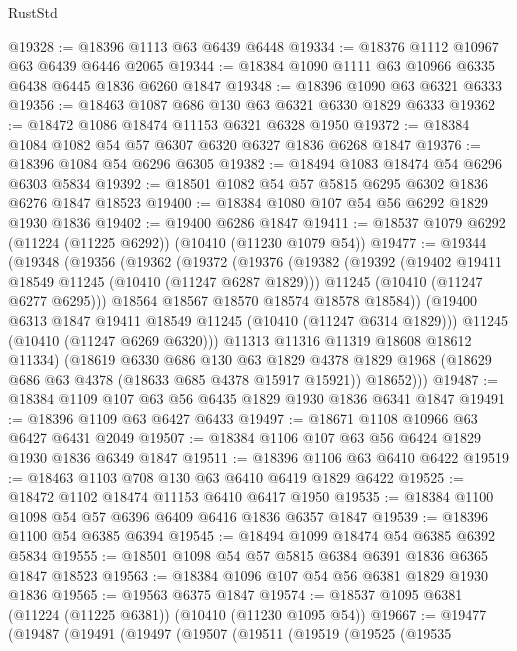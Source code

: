 \begin{lexlean}{RustStd}
\begin{coremodule}
@19328 := @18396 @1113 @63 @6439 @6448
@19334 := @18376 @1112 @10967 @63 @6439 @6446 @2065
@19344 := @18384 @1090 @1111 @63 @10966 @6335 @6438 @6445 @1836 @6260 @1847
@19348 := @18396 @1090 @63 @6321 @6333
@19356 := @18463 @1087 @686 @130 @63 @6321 @6330 @1829 @6333
@19362 := @18472 @1086 @18474 @11153 @6321 @6328 @1950
@19372 := @18384 @1084 @1082 @54 @57 @6307 @6320 @6327 @1836 @6268 @1847
@19376 := @18396 @1084 @54 @6296 @6305
@19382 := @18494 @1083 @18474 @54 @6296 @6303 @5834
@19392 := @18501 @1082 @54 @57 @5815 @6295 @6302 @1836 @6276 @1847 @18523
@19400 := @18384 @1080 @107 @54 @56 @6292 @1829 @1930 @1836
@19402 := @19400 @6286 @1847
@19411 := @18537 @1079 @6292 (@11224 (@11225 @6292)) (@10410 (@11230 @1079 @54))
@19477 := @19344
    (@19348
      (@19356
        (@19362
          (@19372
            (@19376
              (@19382
                (@19392
                  (@19402 @19411 @18549 @11245 (@10410 (@11247 @6287 @1829)))
                  @11245
                  (@10410 (@11247 @6277 @6295)))
                @18564
                @18567
                @18570
                @18574
                @18578
                @18584))
            (@19400 @6313 @1847 @19411 @18549 @11245 (@10410 (@11247 @6314 @1829)))
            @11245
            (@10410 (@11247 @6269 @6320)))
          @11313
          @11316
          @11319
          @18608
          @18612
          @11334)
        (@18619
          @6330
          @686
          @130
          @63
          @1829
          @4378
          @1829
          @1968
          (@18629 @686 @63 @4378 (@18633 @685 @4378 @15917 @15921))
          @18652)))
@19487 := @18384 @1109 @107 @63 @56 @6435 @1829 @1930 @1836 @6341 @1847
@19491 := @18396 @1109 @63 @6427 @6433
@19497 := @18671 @1108 @10966 @63 @6427 @6431 @2049
@19507 := @18384 @1106 @107 @63 @56 @6424 @1829 @1930 @1836 @6349 @1847
@19511 := @18396 @1106 @63 @6410 @6422
@19519 := @18463 @1103 @708 @130 @63 @6410 @6419 @1829 @6422
@19525 := @18472 @1102 @18474 @11153 @6410 @6417 @1950
@19535 := @18384 @1100 @1098 @54 @57 @6396 @6409 @6416 @1836 @6357 @1847
@19539 := @18396 @1100 @54 @6385 @6394
@19545 := @18494 @1099 @18474 @54 @6385 @6392 @5834
@19555 := @18501 @1098 @54 @57 @5815 @6384 @6391 @1836 @6365 @1847 @18523
@19563 := @18384 @1096 @107 @54 @56 @6381 @1829 @1930 @1836
@19565 := @19563 @6375 @1847
@19574 := @18537 @1095 @6381 (@11224 (@11225 @6381)) (@10410 (@11230 @1095 @54))
@19667 := @19477
    (@19487
      (@19491
        (@19497
          (@19507
            (@19511
              (@19519
                (@19525
                  (@19535

\end{coremodule}
\end{lexlean}
